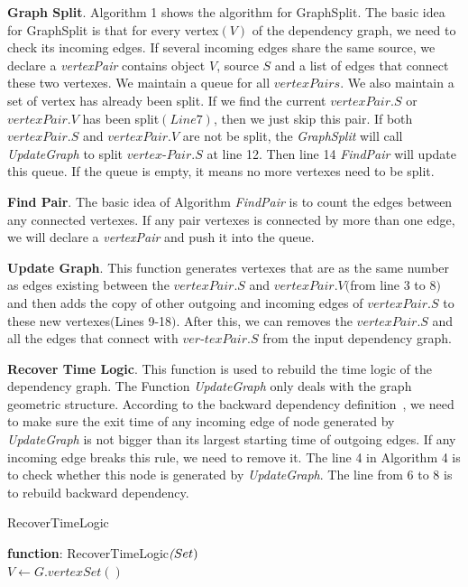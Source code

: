 \textbf{Graph Split}.
Algorithm 1 shows the algorithm for GraphSplit. 
The basic idea for GraphSplit is that for every vertex$(V)$ of the dependency graph, we need to check its incoming edges. If several incoming edges share the same source, we declare a \textit{vertexPair} contains object $V$, source $S$ and a list of edges that connect these two vertexes. We maintain a queue for all $vertexPairs$. We also maintain a set of vertex has already been split. If we find the current $vertexPair.S$ or $vertexPair.V$ has been split$(Line 7)$, then we just skip this pair. If both  $vertexPair.S$ and $vertexPair.V$  are not be split, the \textit{GraphSplit} will call \textit{UpdateGraph} to split $vertex$-$Pair.S$ at line 12. Then line 14 \textit{FindPair} will update this queue. If the queue is empty, it means no more vertexes need to be split.

\textbf{Find Pair}.
The basic idea of Algorithm \textit{FindPair} is to count the edges between any connected vertexes. If any pair vertexes is connected by more than one edge, we will declare a \textit{vertexPair} and push it into the queue. 

\textbf{Update Graph}.
This function generates vertexes that are as the same number as edges existing between the $vertexPair.S$ and $vertexPair.V$$($from line 3 to 8$)$ and then adds the copy of other outgoing and incoming edges of $vertexPair.S$ to these new vertexes$($Lines 9-18$)$. After this, we can removes the $vertexPair.S$ and all the edges that connect with $ver$-$texPair.S$ from the input dependency graph.

\textbf{Recover Time Logic}.
This function is used to rebuild the time logic of the dependency graph. The Function \textit{UpdateGraph} only deals with the graph geometric structure. According to the backward dependency definition~\cite{backtracking,backtrackingfile,backtracking2}, we need to make sure the exit time of any incoming edge of node generated by \textit{UpdateGraph} is not bigger than its largest starting time of outgoing edges. If any incoming edge breaks this rule, we need to remove it. The line 4 in Algorithm 4 is to check whether this node is generated by \textit{UpdateGraph}. The line from 6 to 8 is to rebuild backward dependency.  

\begin{algorithm}[b]
	\caption{RecoverTimeLogic}
	\textbf{function}: RecoverTimeLogic$\textit(Set)$\\
	$V \leftarrow G.vertexSet()$\;
	\label{alg:recover} 	
\end{algorithm}

